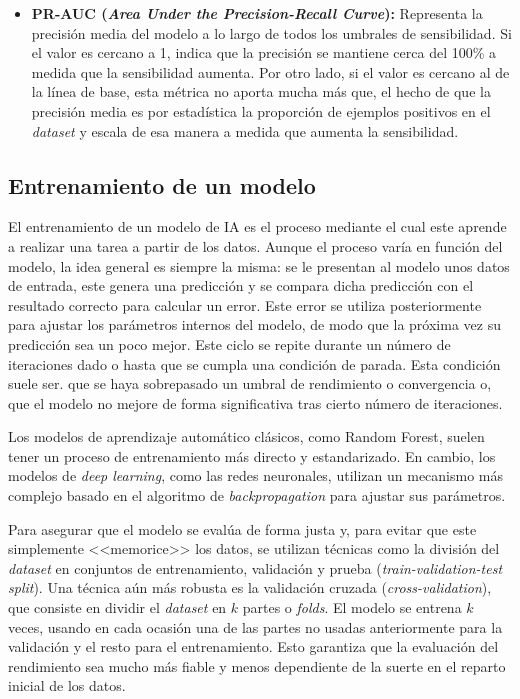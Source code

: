 \begin{itemize}
\begin{itemize}
		\item \textbf{PR-AUC (\textit{Area Under the Precision-Recall Curve}):} Representa la precisión media del modelo a lo largo de todos los umbrales de sensibilidad. Si el valor es cercano a 1, indica que la precisión se mantiene cerca del 100\% a medida que la sensibilidad aumenta. Por otro lado, si el valor es cercano al de la línea de base, esta métrica no aporta mucha más que, el hecho de que la precisión media es por estadística la proporción de ejemplos positivos en el \textit{dataset} y escala de esa manera a medida que aumenta la sensibilidad.
	\end{itemize}
\end{itemize}

\subsection{Entrenamiento de un modelo}

El entrenamiento de un modelo de IA es el proceso mediante el cual este aprende a realizar una tarea a partir de los datos. Aunque el proceso varía en función del modelo, la idea general es siempre la misma: se le presentan al modelo unos datos de entrada, este genera una predicción y se compara dicha predicción con el resultado correcto para calcular un error. Este error se utiliza posteriormente para ajustar los parámetros internos del modelo, de modo que la próxima vez su predicción sea un poco mejor. Este ciclo se repite durante un número de iteraciones dado o hasta que se cumpla una condición de parada. Esta condición suele ser. que se haya sobrepasado un umbral de rendimiento o convergencia o, que el modelo no mejore de forma significativa tras cierto número de iteraciones.

Los modelos de aprendizaje automático clásicos, como Random Forest, suelen tener un proceso de entrenamiento más directo y estandarizado. En cambio, los modelos de \textit{deep learning}, como las redes neuronales, utilizan un mecanismo más complejo basado en el algoritmo de \textit{backpropagation} para ajustar sus parámetros.


Para asegurar que el modelo se evalúa de forma justa y, para evitar que este simplemente <<memorice>> los datos, se utilizan técnicas como la división del \textit{dataset} en conjuntos de entrenamiento, validación y prueba (\textit{train-validation-test split}). Una técnica aún más robusta es la validación cruzada (\textit{cross-validation}), que consiste en dividir el \textit{dataset} en $k$ partes o \textit{folds}. El modelo se entrena $k$ veces, usando en cada ocasión una de las partes no usadas anteriormente para la validación y el resto para el entrenamiento. Esto garantiza que la evaluación del rendimiento sea mucho más fiable y menos dependiente de la suerte en el reparto inicial de los datos.

